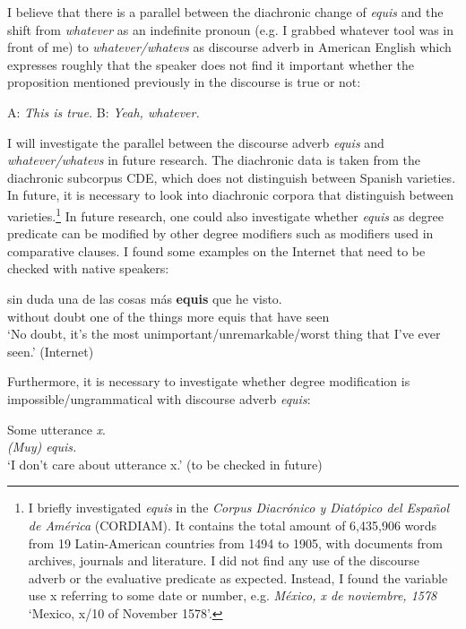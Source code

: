 \documentclass[output=paper]{langsci/langscibook}
\begin{document}
I believe that there is a parallel between the diachronic change of \textit{equis} and the shift from \textit{whatever} as an indefinite pronoun (e.g. I grabbed whatever tool was in front of me) to \textit{whatever/whatevs} as discourse adverb in American English which expresses roughly that the speaker does not find it important whether the proposition mentioned previously in the discourse is true or not:

\ea\label{ex:kellert:70}
A: \textit{This is true.} B: \textit{Yeah, whatever.}
\z

I will investigate the parallel between the discourse adverb \textit{equis} and \textit{whatever/whatevs} in future research. The diachronic data is taken from the diachronic subcorpus CDE, which does not distinguish between Spanish varieties. In future, it is necessary to look into diachronic corpora that distinguish between varieties.\footnote{I briefly investigated \textit{equis} in the \textit{Corpus Diacrónico y Diatópico del Español de América} (CORDIAM). It contains the total amount of 6,435,906 words from 19 Latin-American countries from 1494 to 1905, with documents from archives, journals and literature. I did not find any use of the discourse adverb or the evaluative predicate as expected. Instead, I found the variable use x referring to some date or number, e.g. \textit{México, x de noviembre, 1578} `Mexico, x/10 of November 1578'.}
In future research, one could also investigate whether \textit{equis} as degree predicate can be modified by other degree modifiers such as modifiers used in comparative clauses. I found some examples on the Internet that need to be checked with native speakers:

\ea\label{ex:kellert:71}
\gll sin duda una de las cosas más \textbf{equis} que he visto.\\
without doubt one of the things more equis that have seen\\
\glt ‘No doubt, it’s the most unimportant/unremarkable/worst thing that I’ve ever seen.’ (Internet)
\z

Furthermore, it is necessary to investigate whether degree modification is impossible/ungrammatical with discourse adverb \textit{equis}:

\ea\label{ex:kellert:72}
\begin{xlist}
 Some utterance \textit{x}.\\
 \textit{(Muy) equis.}\\
\glt ‘I don’t care about utterance x.’ (to be checked in future)
\end{xlist}
\z
\end{document}
